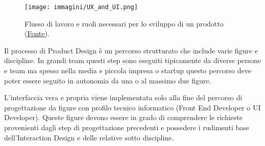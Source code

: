 

\begin{figure}[!h]
	\centering
	\texttt{[image: immagini/UX\_and\_UI.png]}
	\caption{Flusso di lavoro e ruoli necessari per lo sviluppo di un prodotto
	(\href{https://www.crayondata.com/blog/the-difference-between-ui-and-ux/}{\underline{Fonte}}).}
\end{figure}

Il processo di Product Design è un percorso strutturato che include varie figure e discipline. In grandi team questi step sono eseguiti
tipicamente da diverse persone e team ma spesso nella media e piccola impresa o startup questo percorso deve poter essere seguito in autonomia da una
o al massimo due figure.

L'interfaccia vera e propria viene implementata solo alla fine del percorso di progettazione da figure con profilo tecnico informatico
(Front End Developer o UI Developer). Queste figure devono essere in grado di comprendere le richieste provenienti dagli step di progettazione
precedenti e possedere i rudimenti base dell'Interaction Design e delle relative sotto discipline.



